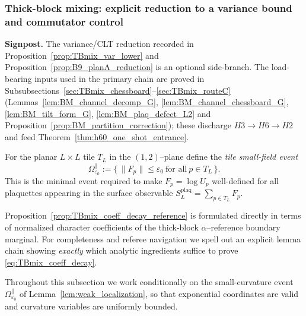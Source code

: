 \subsubsection{Thick-block mixing: explicit reduction to a variance bound and commutator control}\label{sec:TBmix_reduction}


\noindent\textbf{Signpost.} The variance/CLT reduction recorded in Proposition~\ref{prop:TBmix_var_lower} and Proposition~\ref{prop:B9_planA_reduction} is an optional side-branch. The load-bearing inputs used in the primary chain are proved in Subsubsections~\ref{sec:TBmix_chessboard}--\ref{sec:TBmix_routeC} (Lemmas~\ref{lem:BM_channel_decomp_G}, \ref{lem:BM_channel_chessboard_G}, \ref{lem:BM_tilt_form_G}, \ref{lem:BM_plaq_defect_L2} and Proposition~\ref{prop:BM_partition_correction}); these discharge $H3\to H6\to H2$ and feed Theorem~\ref{thm:h60_one_shot_entrance}.\\

\begin{definition}\label{def:Omega_parallel}
For the planar $L\times L$ tile $T_L$ in the $(1,2)$--plane define the \emph{tile small-field event}
\begin{equation}\label{eq:Omega_parallel_def}
\Omega_{\varepsilon_0}^{\parallel}
:=
\bigl\{\,\|F_p\|\le \varepsilon_0\ \text{for all}\ p\in T_L\,\bigr\}.
\end{equation}
This is the minimal event required to make $F_p=\log U_p$ well-defined for all plaquettes appearing in the surface observable
$S_L^{\mathrm{plaq}}=\sum_{p\in T_L}F_p$.
\end{definition}


Proposition~\ref{prop:TBmix_coeff_decay_reference} is formulated directly in terms of normalized character coefficients of the thick-block
$\alpha$--reference boundary marginal. For completeness and referee navigation we spell out an explicit lemma chain
showing \emph{exactly} which analytic ingredients suffice to prove \eqref{eq:TBmix_coeff_decay}.

\smallskip
\noindent
Throughout this subsection we work conditionally on the small-curvature event $\Omega_{\varepsilon_0}^{\parallel}$ of Lemma~\ref{lem:weak_localization},
so that exponential coordinates are valid and curvature variables are uniformly bounded.

